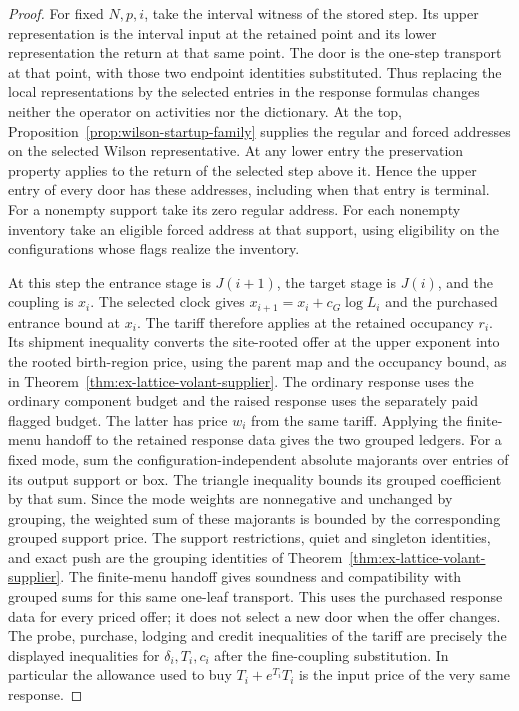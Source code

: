 \begin{proof}
For fixed $N,p,i$, take the interval witness of the stored step.
Its upper representation is the interval input at the retained point
and its lower representation the return at that same point. The door
is the one-step transport at that point, with those two endpoint
identities substituted. Thus replacing the local representations by
the selected entries in the response formulas changes neither the
operator on activities nor the dictionary. At the top,
Proposition~\ref{prop:wilson-startup-family} supplies the regular and
forced addresses on the selected Wilson representative. At any
lower entry the preservation property applies to the return of the
selected step above it. Hence the upper entry of every door has these
addresses, including when that entry is terminal. For a nonempty
support take its zero regular address. For each nonempty inventory
take an eligible forced address at that support, using eligibility
on the configurations whose flags realize the inventory.

At this step the entrance stage is $J(i+1)$, the target stage is
$J(i)$, and the coupling is $x_i$. The selected clock gives
$x_{i+1}=x_i+c_G\log L_i$ and the purchased entrance bound at $x_i$.
The tariff therefore applies at the retained occupancy $r_i$.
Its shipment inequality converts the site-rooted offer at the upper
exponent into the rooted birth-region price, using the parent map
and the occupancy bound, as in
Theorem~\ref{thm:ex-lattice-volant-supplier}. The ordinary response uses
the ordinary component budget and the raised response uses the
separately paid flagged budget. The latter has price $w_i$ from the
same tariff. Applying the finite-menu handoff to the retained
response data gives the two grouped ledgers. For a fixed mode, sum the
configuration-independent absolute majorants over entries of its output
support or box. The triangle inequality bounds its grouped coefficient
by that sum. Since the mode weights are nonnegative and unchanged by
grouping, the weighted sum of these majorants is bounded by the
corresponding grouped support price. The support restrictions,
quiet and singleton identities, and exact push are the grouping
identities of Theorem~\ref{thm:ex-lattice-volant-supplier}. The finite-menu
handoff gives soundness and compatibility with grouped sums for this
same one-leaf transport. This uses the purchased response data for
every priced offer; it does not select a new door when the offer changes.
The probe, purchase, lodging and credit inequalities of the tariff
are precisely the displayed inequalities for $\delta_i,T_i,c_i$
after the fine-coupling substitution. In particular the allowance used
to buy $T_i+e^{T_i}T_i$ is the input price of the very same response.


\end{proof}
